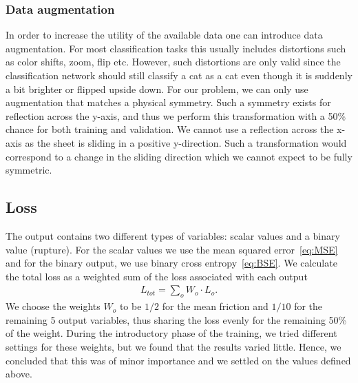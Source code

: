 \subsubsection{Data augmentation}
In order to increase the utility of the available data one can introduce data
augmentation. For most classification tasks this usually includes distortions
such as color shifts, zoom, flip etc. However, such distortions are only valid
since the classification network should still classify a cat as a cat even
though it is suddenly a bit brighter or flipped upside down. For our problem, we
can only use augmentation that matches a physical symmetry. Such a symmetry
exists for reflection across the y-axis, and thus we perform this transformation
with a 50\% chance for both training and validation. We cannot use a reflection
across the x-axis as the sheet is sliding in a positive y-direction. Such a
transformation would correspond to a change in the sliding direction which we
cannot expect to be fully symmetric. 


\subsection{Loss}\label{sec:loss}
The output contains two different types of variables: scalar values and a binary value (rupture). For the scalar values we use the mean squared error~\cref{eq:MSE} and for the binary output, we use binary cross entropy~\cref{eq:BSE}. We calculate the total loss as a weighted sum of the loss associated with
each output
\begin{align*}
  L_{tot} = \sum_{o} W_o\cdot L_o.
\end{align*}
We choose the weights $W_o$ to be $1/2$ for the mean friction and $1/10$ for the
remaining 5 output variables, thus sharing the loss evenly for the remaining 50\% of the weight. During the introductory phase of the training, we tried different settings for these weights, but we found that the results varied little. Hence, we concluded that this was of minor importance and we settled on the values defined above.

